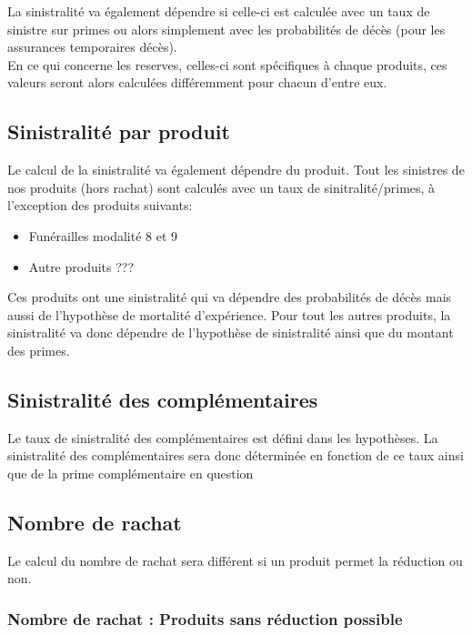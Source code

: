 \documentclass{article}
\begin{document}
La sinistralité va également dépendre si celle-ci est calculée avec un taux de sinistre sur primes ou alors simplement avec les probabilités de décès (pour les assurances temporaires décès).\\

En ce qui concerne les reserves, celles-ci sont spécifiques à chaque produits, ces valeurs seront alors calculées différemment pour chacun d'entre eux.



		
\subsection{Sinistralité par produit}
Le calcul de la sinistralité va également dépendre du produit. Tout les sinistres de nos produits (hors rachat) sont calculés avec un taux de sinitralité/primes, à l'exception des produits suivants:

\begin{itemize}
\item Funérailles modalité 8 et 9
\item Autre produits ???
\end{itemize}


Ces produits ont une sinistralité qui va dépendre des probabilités de décès mais aussi de l'hypothèse de mortalité d'expérience. Pour tout les autres produits, la sinistralité va donc dépendre de l'hypothèse de sinistralité ainsi que du montant des primes.
 
 



\subsection{Sinistralité des complémentaires}


Le taux de sinistralité des complémentaires est défini dans les hypothèses. La sinistralité des complémentaires sera donc déterminée en fonction de ce taux ainsi que de la prime complémentaire en question
 
\subsection{Nombre de rachat}

Le calcul du nombre de rachat sera différent si un produit permet la réduction ou non.

\subsubsection{Nombre de rachat : Produits sans réduction possible}
\end{document}
